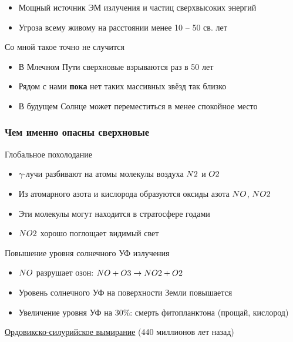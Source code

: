 \documentclass[aspectratio=169]{beamer}
\let\Ch\ch
\let\ch\relax
\begin{document}
\begin{frame}
{\begin{itemize}
\item Мощный источник ЭМ излучения и частиц сверхвысоких энергий
\item Угроза всему живому на расстоянии менее 10 -- 50 св. лет
\end{itemize}
\begin{block}{Со мной такое точно не случится}
\begin{itemize}
\item В Млечном Пути сверхновые взрываются раз в 50 лет
\item Рядом с нами {\bf пока} нет таких массивных звёзд так близко
\item В будущем Солнце может переместиться в менее спокойное место
\end{itemize}
\end{block}
}
\end{frame}

\begin{frame}
\frametitle{Чем именно опасны сверхновые}
\begin{block}{Глобальное похолодание}
\begin{itemize}
\item $\gamma$-лучи разбивают на атомы молекулы воздуха $\Ch{N2}$ и $\Ch{O2}$
\item Из атомарного азота и кислорода образуются оксиды азота $\Ch{NO}$, $\Ch{NO2}$
\item Эти молекулы могут находится в стратосфере годами
\item $\Ch{NO2}$ хорошо поглощает видимый свет
\end{itemize}
\end{block}

\begin{block}{Повышение уровня солнечного УФ излучения}
\begin{itemize}
\item $\Ch{NO}$ разрушает озон: $\Ch{NO} + \Ch{O3} \to \Ch{NO2} + \Ch{O2}$
\item Уровень солнечного УФ на поверхности Земли повышается
\item Увеличение уровня УФ на 30\%: смерть фитопланктона (прощай, кислород)
\end{itemize}
\href{https://руни.рф/index.php/\%D0\%9E\%D1\%80\%D0\%B4\%D0\%BE\%D0\%B2\%D0\%B8\%D0\%BA\%D1\%81\%D0\%BA\%D0\%BE-\%D1\%81\%D0\%B8\%D0\%BB\%D1\%83\%D1\%80\%D0\%B8\%D0\%B9\%D1\%81\%D0\%BA\%D0\%BE\%D0\%B5_\%D0\%B2\%D1\%8B\%D0\%BC\%D0\%B8\%D1\%80\%D0\%B0\%D0\%BD\%D0\%B8\%D0\%B5}{Ордовикско-силурийское вымирание} (440 миллионов лет назад) \cite{arXiv:astro-ph/0309415}
\end{block}
\end{frame}
\end{document}
